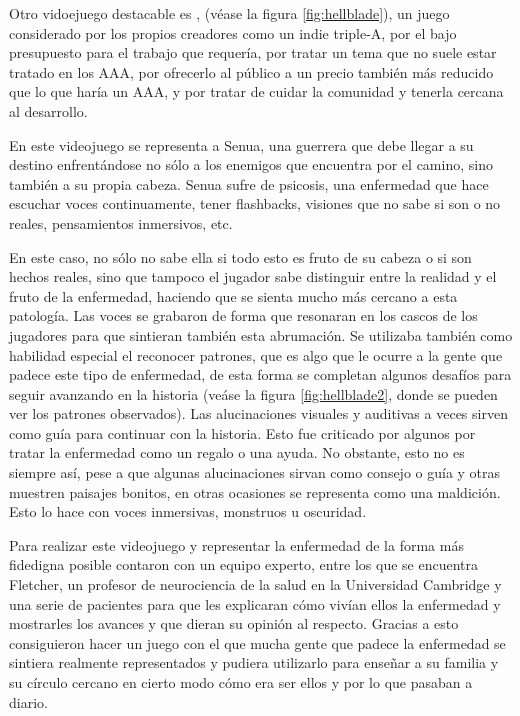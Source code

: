 \documentclass[12pt, a4paper,twoside,titlepage]{book}
\begin{document}
Otro vidoejuego destacable es , (véase la figura \ref{fig:hellblade}), un juego considerado por los propios creadores como un indie triple-A, por el bajo presupuesto para el trabajo que requería, por tratar un tema que no suele estar tratado en los AAA,  por ofrecerlo al público a un precio también más reducido que lo que haría un AAA, y por tratar de cuidar la comunidad y tenerla cercana al desarrollo. 

En este videojuego se representa a Senua, una guerrera que debe llegar a su destino enfrentándose no sólo a los enemigos que encuentra por el camino, sino también a su propia cabeza. Senua sufre de psicosis, una enfermedad que hace escuchar voces continuamente, tener flashbacks, visiones que no sabe si son o no reales, pensamientos inmersivos, etc. 

En este caso, no sólo no sabe ella si todo esto es fruto de su cabeza o si son hechos reales, sino que tampoco el jugador sabe distinguir entre la realidad y el fruto de la enfermedad, haciendo que se sienta mucho más cercano a esta patología. Las voces se grabaron de forma que resonaran en los cascos de los jugadores para que sintieran también esta abrumación. Se utilizaba también como habilidad especial el reconocer patrones, que es algo que le ocurre a la gente que padece este tipo de enfermedad, de esta forma se completan algunos desafíos para seguir avanzando en la historia (veáse la figura \ref{fig:hellblade2}, donde se pueden ver los patrones observados). Las alucinaciones visuales y auditivas a veces sirven como guía para continuar con la historia. Esto fue criticado por algunos por tratar la enfermedad como un regalo o una ayuda. No obstante, esto no es siempre así, pese a que algunas alucinaciones sirvan como consejo o guía y otras muestren paisajes bonitos, en otras ocasiones se representa como una maldición. Esto lo hace con voces inmersivas, monstruos u oscuridad. 

Para realizar este videojuego y representar la enfermedad de la forma más fidedigna posible contaron con un equipo experto, entre los que se encuentra Fletcher, un profesor de neurociencia de la salud en la Universidad Cambridge y una serie de pacientes para que les explicaran cómo vivían ellos la enfermedad y mostrarles los avances y que dieran su opinión al respecto. Gracias a esto consiguieron hacer un juego con el que mucha gente que padece la enfermedad se sintiera realmente representados y pudiera utilizarlo para enseñar a su familia y su círculo cercano en cierto modo cómo era ser ellos y por lo que pasaban a diario. 
\end{document}
